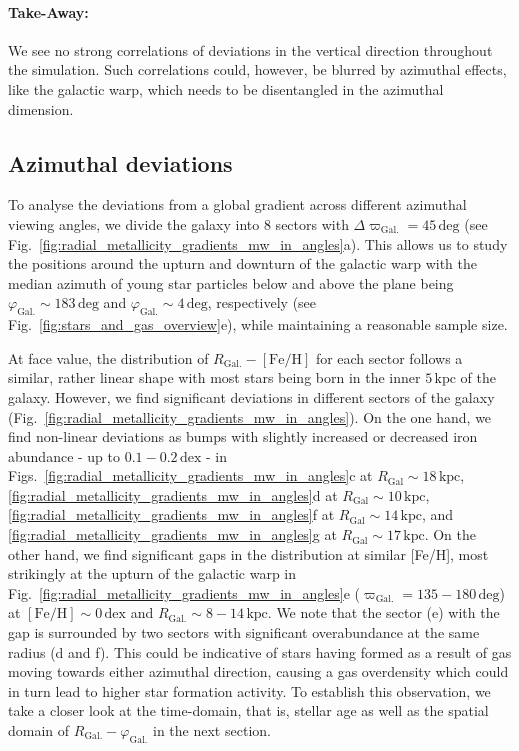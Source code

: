 \documentclass[twocolumn,apj,numberedappendix,appendixfloats]{openjournal}
\begin{document}
\begin{CJK*}{UTF8}{gbsn}
\paragraph*{Take-Away:} We see no strong correlations of deviations in the vertical direction throughout the simulation. Such correlations could, however, be blurred by azimuthal effects, like the galactic warp, which needs to be disentangled in the azimuthal dimension.

\subsection{Azimuthal deviations}
\label{sec:coherence_azimuth_radial_metallicity_gradients}

To analyse the deviations from a global gradient across different azimuthal viewing angles, we divide the galaxy into 8 sectors with $\Delta \varpi_\mathrm{Gal.} = 45\,\mathrm{deg}$ (see Fig.~\ref{fig:radial_metallicity_gradients_mw_in_angles}a). This allows us to study the positions around the upturn and downturn of the galactic warp with the median azimuth of young star particles below and above the plane being $\varphi_\mathrm{Gal.} \sim 183\,\mathrm{deg}$ and $\varphi_\mathrm{Gal.} \sim 4\,\mathrm{deg}$, respectively (see Fig.~\ref{fig:stars_and_gas_overview}e), while maintaining a reasonable sample size.

At face value, the distribution of $R_\mathrm{Gal.}-\mathrm{[Fe/H]}$ for each sector follows a similar, rather linear shape with most stars being born in the inner $5\,\mathrm{kpc}$ of the galaxy. However, we find significant deviations in different sectors of the galaxy (Fig.~\ref{fig:radial_metallicity_gradients_mw_in_angles}). On the one hand, we find non-linear deviations as bumps with slightly increased or decreased iron abundance - up to $0.1-0.2\,\mathrm{dex}$ - in Figs.~\ref{fig:radial_metallicity_gradients_mw_in_angles}c at $R_\mathrm{Gal} \sim 18\,\mathrm{kpc}$, \ref{fig:radial_metallicity_gradients_mw_in_angles}d at $R_\mathrm{Gal} \sim 10\,\mathrm{kpc}$, \ref{fig:radial_metallicity_gradients_mw_in_angles}f at $R_\mathrm{Gal} \sim 14\,\mathrm{kpc}$, and \ref{fig:radial_metallicity_gradients_mw_in_angles}g at $R_\mathrm{Gal} \sim 17\,\mathrm{kpc}$. On the other hand, we find significant gaps in the distribution at similar [Fe/H], most strikingly at the upturn of the galactic warp in Fig.~\ref{fig:radial_metallicity_gradients_mw_in_angles}e ($\varpi_\mathrm{Gal.} = 135-180\,\mathrm{deg}$) at $\mathrm{[Fe/H]} \sim 0\,\mathrm{dex}$ and $R_\mathrm{Gal.} \sim 8-14\,\mathrm{kpc}$. We note that the sector (e) with the gap is surrounded by two sectors with significant overabundance at the same radius (d and f). This could be indicative of stars having formed as a result of gas moving towards either azimuthal direction, causing a gas overdensity which could in turn lead to higher star formation activity. To establish this observation, we take a closer look at the time-domain, that is, stellar age as well as the spatial domain of $R_\mathrm{Gal.}-\varphi_\mathrm{Gal.}$ in the next section. 


\end{CJK*}
\end{document}
